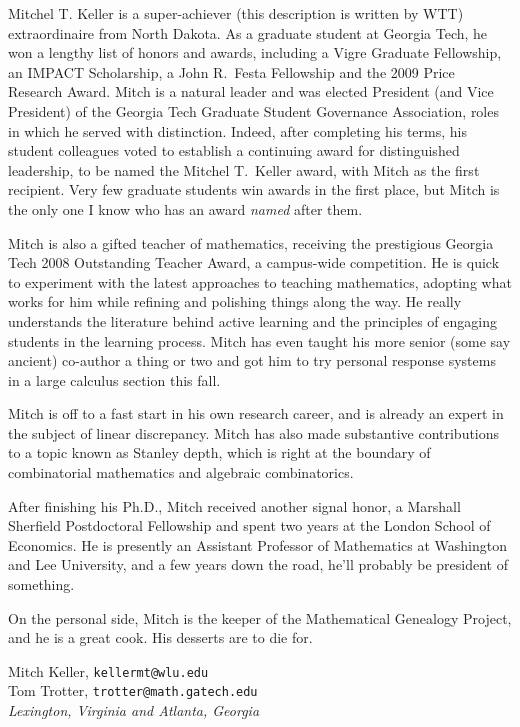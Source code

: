 \bigskip
\noindent
Mitchel T. Keller is a super-achiever (this description is written by WTT) 
extraordinaire from North Dakota.  As a graduate student at Georgia Tech,
he won a lengthy list of honors and awards, including a Vigre Graduate
Fellowship, an IMPACT Scholarship, a John R.~Festa Fellowship and
the 2009 Price Research Award.  Mitch is a natural leader and was
elected President (and Vice President) of the Georgia Tech Graduate
Student Governance Association, roles in which he served with distinction.
Indeed, after completing his terms, his student colleagues voted to
establish a continuing award for distinguished leadership, to be named
the Mitchel T.~Keller award, with Mitch as the first recipient.  Very
few graduate students win awards in the first place, but Mitch is the
only one I know who has an award \textit{named} after them.

Mitch is also a gifted teacher of mathematics, receiving the prestigious
Georgia Tech 2008 Outstanding Teacher Award, a campus-wide competition.  
He is quick to experiment with the latest approaches to teaching mathematics, 
adopting what works for him while refining and polishing things along the
way.  He really understands the literature behind active learning
and the principles of engaging students in the learning process.  
Mitch has even taught his more senior (some say ancient)
co-author a thing or two and got him to try personal response
systems in a large calculus section this fall.

Mitch is off to a fast start in his own research career, and is already
an expert in the subject of linear discrepancy.  Mitch has also made
substantive contributions to a topic known as Stanley depth,
which is right at the boundary of combinatorial mathematics and
algebraic combinatorics.

After finishing his Ph.D., Mitch received another signal honor,
a Marshall Sherfield Postdoctoral Fellowship and spent 
two years at the London School of Economics.  He is presently an
Assistant Professor of Mathematics at Washington and Lee University, and a few years down the road,
he'll probably be president of something.

On the personal side, Mitch is the keeper of the Mathematical
Genealogy Project, and he is a great cook.  His desserts are to
die for.

\begin{flushright}
  Mitch Keller, \texttt{kellermt@wlu.edu}\\
  Tom Trotter, \texttt{trotter@math.gatech.edu}\\
  \textit{Lexington, Virginia and Atlanta, Georgia}
\end{flushright}


